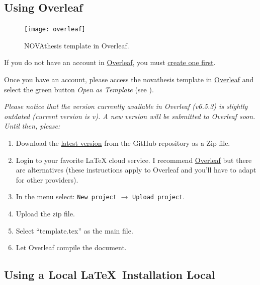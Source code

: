 \subsection{Using Overleaf}
\label{sub:using_overleaf}


\begin{figure}
\vspace*{-10ex}
\texttt{[image: overleaf]}%
\caption{NOVAthesis template in Overleaf.}
\label{fig:overleaf}
\end{figure}

If you do not have an account in \href{https://www.overleaf.com?r=f5160636&rm=d&rs=b}{Overleaf}, you must \href{https://www.overleaf.com?r=f5160636&rm=d&rs=b}{create one first}.

Once you have an account, please access the \gls{novathesis} template in \href{https://www.overleaf.com/latex/templates/new-university-of-lisbon-universidade-nova-de-lisboa-slash-unl-thesis-template/fwbztcrptjmg}{Overleaf} and select the green button \emph{Open as Template} (see ).

\bgroup
  \itshape
  Please notice that the version currently available in Overleaf (v6.5.3) is slightly outdated (current version is v\novathesisversion). A new version will be submitted to Overleaf soon.  Until then, please:
  \begin{enumerate}
    \item Download the \href{https://github.com/joaomlourenco/novathesis/archive/master.zip}{latest version} from the GitHub repository as a Zip file.
    \item Login to your favorite LaTeX cloud service. I recommend \href{https://www.overleaf.com/?r=f5160636&rm=d&rs=b}{Overleaf} but there are alternatives (these instructions apply to Overleaf and you'll have to adapt for other providers).
    \item In the menu select: \texttt{New project} $\rightarrow$ \texttt{Upload project}.
    \item Upload the zip file.
    \item Select “template.tex” as the main file.
    \item Let Overleaf compile the document.
  \end{enumerate}
\egroup

\subsection{Using a Local \LaTeX\ Installation Local}
\label{sub:using_local_latex}

